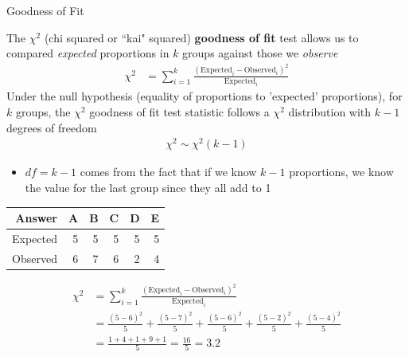 \documentclass{beamer}
\begin{document}
\begin{frame}{Goodness of Fit}

The $\chi^2$ (chi squared or ``kai" squared) \textbf{goodness of fit} test allows us to compared \textit{expected} proportions in $k$ groups against those we \textit{observe}
\begin{align*}
\chi^2 &= \sum_{i=1}^k \frac{(\text{Expected}_i - \text{Observed}_i)^2}{\text{Expected}_i} 
\end{align*}
Under the null hypothesis (equality of proportions to 'expected' proportions), for $k$ groups, the $\chi^2$ goodness of fit test statistic follows a $\chi^2$ distribution with $k-1$ degrees of freedom
\begin{align*}
\chi^2 \sim \chi^2(k-1)
\end{align*}
\begin{itemize}
    \item $df = k-1$ comes from the fact that if we know $k-1$ proportions, we know the value for the last group since they all add to 1
\end{itemize}
\end{frame}

\begin{frame}
\begin{table}[ht]
\centering
\begin{tabular}{rrrrrr}
  \hline
Answer & A & B & C & D & E \\ 
  \hline
Expected & 5 & 5 & 5 & 5 & 5 \\ 
  Observed & 6 & 7 & 6 & 2 & 4 \\ 
   \hline
\end{tabular}
\end{table}

\begin{align*}
\chi^2 &= \sum_{i=1}^k \frac{(\text{Expected}_i - \text{Observed}_i)^2}{\text{Expected}_i} \\[1em]
&= \frac{(5-6)^2}{5} + \frac{(5-7)^2}{5} + \frac{(5-6)^2}{5} + \frac{(5-2)^2}{5}+\frac{(5-4)^2}{5} \\[1em]
&= \frac{1 + 4 + 1 + 9 + 1}{5} = \frac{16}{5} = 3.2
\end{align*}

\end{frame}
\end{document}
